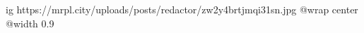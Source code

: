  
 
 
 
 

\ifcmt
  ig https://mrpl.city/uploads/posts/redactor/zw2y4brtjmqi31sn.jpg
  @wrap center
  @width 0.9
\fi
